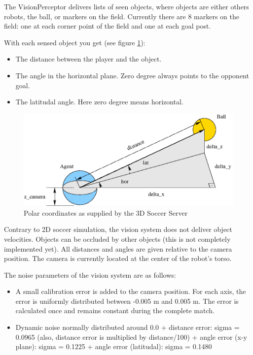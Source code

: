 The VisionPerceptor delivers lists of seen objects, where objects are
either others robots, the ball, or markers on the field. Currently
there are 8 markers on the field: one at each corner point of the
field and one at each goal post.

With each sensed object you get (see figure \ref{fig:polarcoordinates}):

\begin{itemize}
  \item The distance between the player and the object.
  \item The angle in the horizontal plane. Zero degree always points to the
opponent goal.
  \item The latitudal angle. Here zero degree means horizontal. 
\end{itemize}

\begin{figure}[htp]
  \centering
  \includegraphics[scale=0.4]{fig/polar_conversion}
  \caption{Polar coordinates as supplied by the 3D Soccer Server \cite{Vorst06}}
  \label{fig:polarcoordinates}
\end{figure}

Contrary to 2D soccer simulation, the vision system does not deliver
object velocities. Objects can be occluded by other objects (this is
not completely implemented yet). All distances and angles are given
relative to the camera position. The camera is currently located at
the center of the robot's torso.


The noise parameters of the vision system are as follows:
\begin{itemize}
  \item A small calibration error is added to the camera position. For each
  axis, the error is uniformly distributed between -0.005 m and 0.005 m. The
  error is calculated once and remains constant during the complete match.
  \item Dynamic noise normally distributed around 0.0
  \subitem + distance error:  sigma = 0.0965 (also, distance error is multiplied by distance/100)
  \subitem + angle error (x-y plane): sigma = 0.1225
  \subitem + angle error (latitudal): sigma = 0.1480
\end{itemize}

